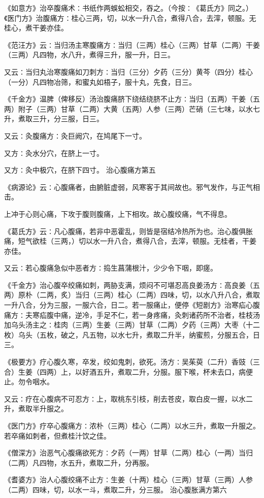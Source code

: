 \documentclass[a4paper,12pt,UTF8,twoside]{ctexbook}
\begin{document}
《如意方》治卒腹痛术∶书纸作两蜈蚣相交，吞之。（今按∶《葛氏方》同之。）《医门方》治腹痛方∶桂心三两，切，以水一升八合，煮得八合，去滓，顿服。无桂心，煮干姜亦佳。

《范汪方》云∶当归汤主寒腹痛方∶当归（三两）桂心（三两）甘草（二两）干姜（三两）凡四物，水八升，煮得三升，服一升，日三。

又云∶当归丸治寒腹痛如刀刺方∶当归（三分）夕药（三分）黄芩（四分）桂心（一分）凡四物冶筛，和蜜丸如梧子，服十丸，先食，日三。

《千金方》温脾（俾移反）汤治腹痛脐下绕结绕脐不止方∶当归（五两）干姜（五两）附子（三两）甘草（二两）大黄（五两）人参（三两）芒硝（三七味，以水七升，煮取三升，分三服，日三。

又云∶灸腹痛方∶灸巨阙穴，在鸠尾下一寸。

又方∶灸水分穴，在脐上一寸。

又方∶灸中极穴，在脐下四寸。
治心腹痛方第五

《病源论》云∶心腹痛者，由腑脏虚弱，风寒客于其间故也。邪气发作，与正气相击。

上冲于心则心痛，下攻于腹则腹痛，上下相攻。故心腹绞痛，气不得息。

《葛氏方》云∶凡心腹痛，若非中恶霍乱，则皆是宿结冷热所为也。治心腹俱胀痛，短气欲桂（三两，）切以水一升八合，煮得八合，去滓，顿服。无桂者，干姜亦佳。

又云∶若心腹痛急似中恶者方∶捣生菖蒲根汁，少少令下咽，即瘥。

《千金方》治心腹卒绞痛如刺，两胁支满，烦闷不可堪忍高良姜汤方∶高良姜（五两）原朴（二两，炙）当归（三两）桂心（二两）四味，切，以水八升八合，煮取一升八合，分为三服，一服六合，日二。若一服痛止，便停《短剧方》治寒疝心腹痛方∶夫寒疝腹中痛，逆冷，手足不仁，若一身疼痛，灸刺诸药所不治者，桂枝汤加乌头汤主之∶桂肉（三两）生姜（三两）甘草（二两）夕药（三两）大枣（十二枚）乌头（五枚，破之，凡五物，以水七升，煮取二升半，纳蜜煎，分服五合，日三。

《极要方》疗心腹久寒，卒发，绞如鬼刺，欲死。汤方∶吴茱萸（二升）香豉（三合）生姜（四两）上，以好酒五升，煮取二升，分服。服下喉，杯未去口，病便止。勿令咽水。

又云∶疗在心腹病不可忍方∶上，取桃东引枝，削去苍皮，取白皮一握，以水二升，煮取半升服之。

《医门方》疗卒心腹痛方∶浓朴（三两）桂心（二两）以水三升，煮取一升服之。若卒痛如刺者，但煮桂汁饮之佳。

《僧深方》治恶气心腹痛欲死方∶夕药（一两）甘草（二两）桂心（一两）当归（二两）凡四物，水五升，煮取二升，分再服。

《耆婆方》治人心腹绞痛不止方∶生姜（十两）桂心（三两）甘草（三两）人参（二两）四味，切，以水一斗，煮取二升，分三服。
治心腹胀满方第六
\end{document}

